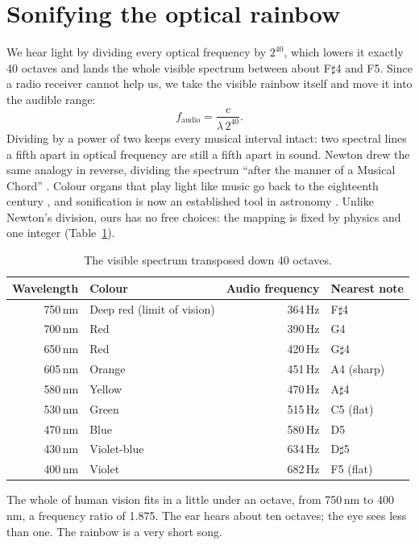 \documentclass[11pt,a4paper]{article}
\newcommand{\sh}{\ensuremath{\sharp}}
\begin{document}
\section{Sonifying the optical rainbow}

We hear light by dividing every optical frequency by $2^{40}$, which lowers it exactly 40 octaves and lands the whole visible spectrum between about F\sh4 and F5. Since a radio receiver cannot help us, we take the visible rainbow itself and move it into the audible range:
\begin{equation}
  f_{\mathrm{audio}} = \frac{c}{\lambda\,2^{40}} .
\end{equation}
Dividing by a power of two keeps every musical interval intact: two spectral lines a fifth apart in optical frequency are still a fifth apart in sound. Newton drew the same analogy in reverse, dividing the spectrum ``after the manner of a Musical Chord'' \citep{newton1730}. Colour organs that play light like music go back to the eighteenth century \citep{peacock1988}, and sonification is now an established tool in astronomy \citep{zanella2022,chandra2020}. Unlike Newton's division, ours has no free choices: the mapping is fixed by physics and one integer (Table~\ref{tab:notes}).

\begin{table}[ht]
\centering
\caption{The visible spectrum transposed down 40 octaves.}
\label{tab:notes}
\small
\begin{tabular}{@{}r l r l@{}}
\toprule
Wavelength & Colour & Audio frequency & Nearest note \\
\midrule
750\,nm & Deep red (limit of vision) & 364\,Hz & F\sh4 \\
700\,nm & Red & 390\,Hz & G4 \\
650\,nm & Red & 420\,Hz & G\sh4 \\
605\,nm & Orange & 451\,Hz & A4 (sharp) \\
580\,nm & Yellow & 470\,Hz & A\sh4 \\
530\,nm & Green & 515\,Hz & C5 (flat) \\
470\,nm & Blue & 580\,Hz & D5 \\
430\,nm & Violet-blue & 634\,Hz & D\sh5 \\
400\,nm & Violet & 682\,Hz & F5 (flat) \\
\bottomrule
\end{tabular}
\end{table}

The whole of human vision fits in a little under an octave, from 750\,nm to 400\,nm, a frequency ratio of 1.875. The ear hears about ten octaves; the eye sees less than one. The rainbow is a very short song.
\end{document}
